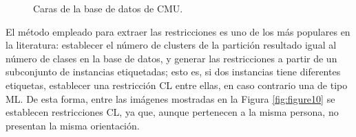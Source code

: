 \clearpage

\begin{figure}[bth]
	\myfloatalign
	 \quad
	 \quad
	 \quad
	\caption[Caras de la base de datos de  CMU.]{Caras de la base de datos de  CMU. \cite{Survey:2007}}\label{fig:figure9}
\end{figure}

El método empleado para extraer las restricciones es uno de los más populares en la literatura: establecer el número de clusters de la partición resultado igual al número de clases en la base de datos, y generar las restricciones a partir de un subconjunto de instancias etiquetadas; esto es, si dos instancias tiene diferentes etiquetas, establecer una restricción \acf{CL} entre ellas, en caso contrario una de tipo \acf{ML}. De esta forma, entre las imágenes mostradas en la Figura \ref{fig:figure10} se establecen restricciones \acf{CL}, ya que, aunque pertenecen a la misma persona, no presentan la misma orientación.

